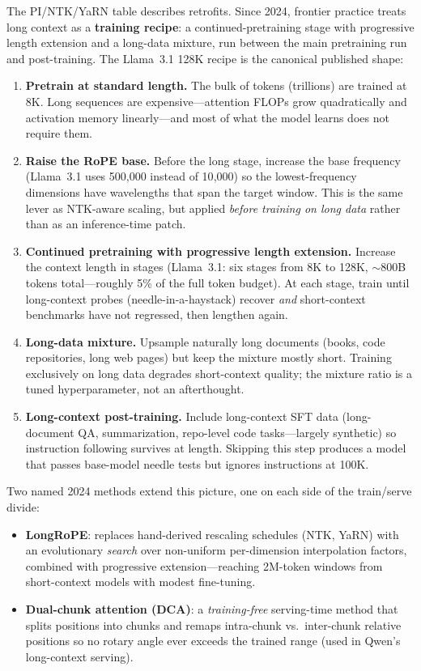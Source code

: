 The PI/NTK/YaRN table describes retrofits. Since 2024, frontier practice treats long context as a \textbf{training recipe}: a continued-pretraining stage with progressive length extension and a long-data mixture, run between the main pretraining run and post-training. The Llama~3.1 128K recipe is the canonical published shape:

\begin{enumerate}
    \item \textbf{Pretrain at standard length.} The bulk of tokens (trillions) are trained at 8K. Long sequences are expensive---attention FLOPs grow quadratically and activation memory linearly---and most of what the model learns does not require them.
    \item \textbf{Raise the RoPE base.} Before the long stage, increase the base frequency (Llama~3.1 uses 500{,}000 instead of 10{,}000) so the lowest-frequency dimensions have wavelengths that span the target window. This is the same lever as NTK-aware scaling, but applied \textit{before training on long data} rather than as an inference-time patch.
    \item \textbf{Continued pretraining with progressive length extension.} Increase the context length in stages (Llama~3.1: six stages from 8K to 128K, $\sim$800B tokens total---roughly 5\% of the full token budget). At each stage, train until long-context probes (needle-in-a-haystack) recover \textit{and} short-context benchmarks have not regressed, then lengthen again.
    \item \textbf{Long-data mixture.} Upsample naturally long documents (books, code repositories, long web pages) but keep the mixture mostly short. Training exclusively on long data degrades short-context quality; the mixture ratio is a tuned hyperparameter, not an afterthought.
    \item \textbf{Long-context post-training.} Include long-context SFT data (long-document QA, summarization, repo-level code tasks---largely synthetic) so instruction following survives at length. Skipping this step produces a model that passes base-model needle tests but ignores instructions at 100K.
\end{enumerate}

Two named 2024 methods extend this picture, one on each side of the train/serve divide:
\begin{itemize}
    \item \textbf{LongRoPE}: replaces hand-derived rescaling schedules (NTK, YaRN) with an evolutionary \textit{search} over non-uniform per-dimension interpolation factors, combined with progressive extension---reaching 2M-token windows from short-context models with modest fine-tuning.
    \item \textbf{Dual-chunk attention (DCA)}: a \textit{training-free} serving-time method that splits positions into chunks and remaps intra-chunk vs.\ inter-chunk relative positions so no rotary angle ever exceeds the trained range (used in Qwen's long-context serving).
\end{itemize}

